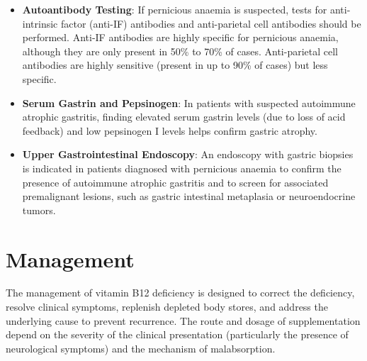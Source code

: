 \begin{itemize}
    \item \textbf{Autoantibody Testing}: If pernicious anaemia is suspected, tests for anti-intrinsic factor (anti-IF) antibodies and anti-parietal cell antibodies should be performed. Anti-IF antibodies are highly specific for pernicious anaemia, although they are only present in 50\% to 70\% of cases. Anti-parietal cell antibodies are highly sensitive (present in up to 90\% of cases) but less specific.
    \item \textbf{Serum Gastrin and Pepsinogen}: In patients with suspected autoimmune atrophic gastritis, finding elevated serum gastrin levels (due to loss of acid feedback) and low pepsinogen I levels helps confirm gastric atrophy.
    \item \textbf{Upper Gastrointestinal Endoscopy}: An endoscopy with gastric biopsies is indicated in patients diagnosed with pernicious anaemia to confirm the presence of autoimmune atrophic gastritis and to screen for associated premalignant lesions, such as gastric intestinal metaplasia or neuroendocrine tumors.
\end{itemize}

\section*{Management}
The management of vitamin B12 deficiency is designed to correct the deficiency, resolve clinical symptoms, replenish depleted body stores, and address the underlying cause to prevent recurrence. The route and dosage of supplementation depend on the severity of the clinical presentation (particularly the presence of neurological symptoms) and the mechanism of malabsorption.

